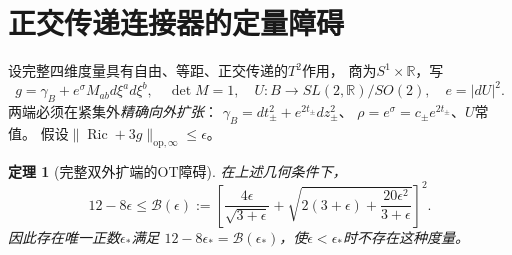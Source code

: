 \documentclass[UTF8,a4paper,11pt,fontset=fandol]{ctexart}
\numberwithin{equation}{section}
\newtheorem{theorem}{定理}[section]
\theoremstyle{definition}
\newcommand{\Ric}{\operatorname{Ric}}
\newcommand{\op}{\mathrm{op}}
\begin{document}
\section{正交传递连接器的定量障碍}
设完整四维度量具有自由、等距、正交传递的$T^2$作用，
商为$S^1\times\mathbb R$，写
\[
 g=\gamma_B+e^\sigma M_{ab}d\xi^ad\xi^b,
 \quad\det M=1,\quad
 U:B\to SL(2,\mathbb R)/SO(2),\quad e=|dU|^2.
\]
两端必须在紧集外\emph{精确向外扩张}：
$\gamma_B=dt_\pm^2+e^{2t_\pm}dz_\pm^2$、
$\rho=e^\sigma=c_\pm e^{2t_\pm}$、$U$常值。
假设$\|\Ric+3g\|_{\op,\infty}\le\epsilon$。
\begin{theorem}[完整双外扩端的OT障碍]\label{thm:OT}
在上述几何条件下，
\[
 12-8\epsilon\le
 \mathcal B(\epsilon):=
 \left[\frac{4\epsilon}{\sqrt{3+\epsilon}}
 +\sqrt{2(3+\epsilon)+\frac{20\epsilon^2}{3+\epsilon}}\right]^2.
\]
因此存在唯一正数$\epsilon_*$满足
$12-8\epsilon_*=\mathcal B(\epsilon_*)$，使$\epsilon<\epsilon_*$时不存在这种度量。
\end{theorem}
\end{document}
